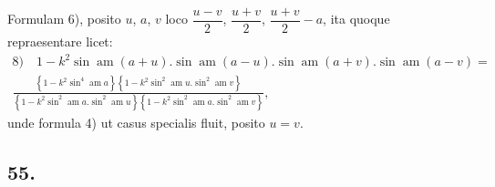 \documentclass{article}
\begin{document}
Formulam 6), posito $u$, $a$, $v$ loco $\dfrac{u-v}{2}$, $\dfrac{u+v}{2}$, $\dfrac{u+v}{2}-a$, ita quoque repraesentare licet:
\[
\begin{gathered}
\text{8)}\quad 1-k^{2}\sin\operatorname{am}(a+u).\sin\operatorname{am}(a-u).\sin\operatorname{am}(a+v).\sin\operatorname{am}(a-v)=\\[1.5ex]
\frac{\left\{1-k^{2}\sin^{4}\operatorname{am}a\right\}\left\{1-k^{2}\sin^{2}\operatorname{am}u.\sin^{2}\operatorname{am}v\right\}}{\left\{1-k^{2}\sin^{2}\operatorname{am}a.\sin^{2}\operatorname{am}u\right\}\left\{1-k^{2}\sin^{2}\operatorname{am}a.\sin^{2}\operatorname{am}v\right\}},
\end{gathered}
\]
unde formula 4) ut casus specialis fluit, posito $u=v$.

\subsection*{55.}
\end{document}
